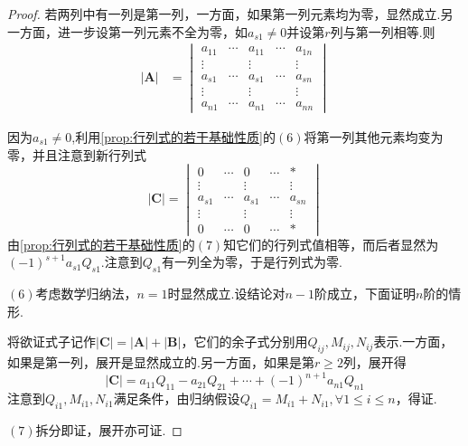 {\begin{proof}
        若两列中有一列是第一列，一方面，如果第一列元素均为零，显然成立.另一方面，进一步设第一列元素不全为零，如$a_{s1}\neq 0$并设第$r$列与第一列相等.则\begin{align*}
            \left|\bm{A}\right| & =\begin{vmatrix}
                                       a_{11} & \cdots & a_{11} & \cdots & a_{1n} \\
                                       \vdots &        & \vdots &        & \vdots \\
                                       a_{s1} & \cdots & a_{s1} & \cdots & a_{sn} \\
                                       \vdots &        & \vdots &        & \vdots \\
                                       a_{n1} & \cdots & a_{n1} & \cdots & a_{nn}
                                   \end{vmatrix}
        \end{align*}

        因为$a_{s1}\neq 0$,利用\cref{prop:行列式的若干基础性质}的$(6)$将第一列其他元素均变为零，并且注意到新行列式
        \[
            \left|\bm{C}\right|=\begin{vmatrix}
                0      & \cdots & 0      & \cdots & *      \\
                \vdots &        & \vdots &        & \vdots \\
                a_{s1} & \cdots & a_{s1} & \cdots & a_{sn} \\
                \vdots &        & \vdots &        & \vdots \\
                0      & \cdots & 0      & \cdots & *
            \end{vmatrix}
        \]由\cref{prop:行列式的若干基础性质}的$(7)$知它们的行列式值相等，而后者显然为$\displaystyle
            \left(-1\right)^{s+1}a_{s1}Q_{s1}$.注意到$Q_{s1}$有一列全为零，于是行列式为零.

        $(6)$考虑数学归纳法，$n=1$时显然成立.设结论对$n-1$阶成立，下面证明$n$阶的情形.

        将欲证式子记作$\left|\bm{C}\right|=\left|\bm{A}\right|+\left|\bm{B}\right|$，它们的余子式分别用$Q_{ij},M_{ij},N_{ij}$表示.一方面，如果是第一列，展开是显然成立的.另一方面，如果是第$r\geqslant 2$列，展开得\[
            \left|\bm{C}\right|=a_{11}Q_{11}-a_{21}Q_{21}+\cdots+(-1)^{n+1}a_{n1}Q_{n1}
        \]注意到$Q_{i1},M_{i1},N_{i1}$满足条件，由归纳假设$Q_{i1}=M_{i1}+N_{i1},\forall 1\leqslant i\leqslant n$，得证.

        $(7)$拆分即证，展开亦可证.\qedhere
    \end{proof}
}
